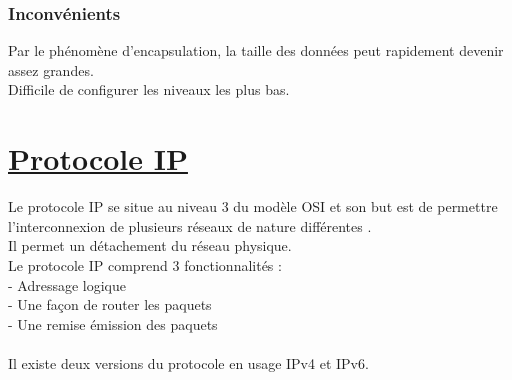 \documentclass{article}
\begin{document}
\subsubsection*{Inconvénients}
Par le phénomène d’encapsulation, la taille des données peut rapidement devenir assez grandes. \\
Difficile de configurer les niveaux les plus bas. \\

\section{\underline{Protocole IP}}
Le protocole IP se situe au niveau 3 du modèle OSI et son but est de permettre l’interconnexion de plusieurs réseaux de nature différentes . \\
Il permet un détachement du réseau physique. \\
Le protocole IP comprend 3 fonctionnalités : \\
- Adressage logique \\
- Une façon de router les paquets \\
- Une remise émission des paquets \\
\\
Il existe deux versions du protocole en usage IPv4 et IPv6.
\\
\end{document}
